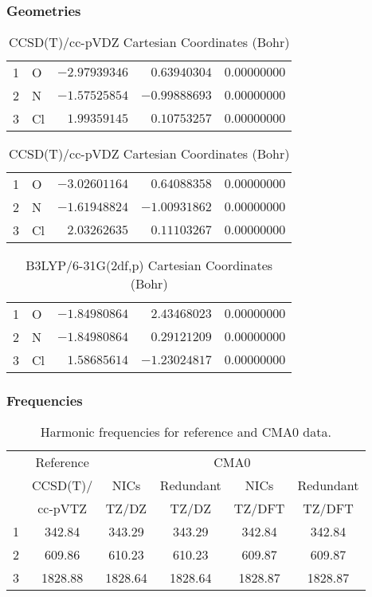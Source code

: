 \documentclass[10pt,oneside]{article}
\begin{document}
\begin{table}[h!]
\subsubsection*{Geometries}
\begin{multicols}{2}
\centering
\caption{CCSD(T)/cc-pVTZ Cartesian Coordinates (Bohr)}
\begin{tabular}{llrrr}
\toprule
1  & O  & $-2.97939346$ & $ 0.63940304$ & $ 0.00000000$ \\
2  & N  & $-1.57525854$ & $-0.99888693$ & $ 0.00000000$ \\
3  & Cl & $ 1.99359145$ & $ 0.10753257$ & $ 0.00000000$ \\
\bottomrule
\end{tabular}
\caption{CCSD(T)/cc-pVDZ Cartesian Coordinates (Bohr)}
\begin{tabular}{llrrr}
\toprule
1  & O  & $-3.02601164$ & $ 0.64088358$ & $ 0.00000000$ \\
2  & N  & $-1.61948824$ & $-1.00931862$ & $ 0.00000000$ \\
3  & Cl & $ 2.03262635$ & $ 0.11103267$ & $ 0.00000000$ \\
\bottomrule
\end{tabular}
\end{multicols}
\end{table}

\begin{table}[h]
\centering
\caption{B3LYP/6-31G(2df,p) Cartesian Coordinates (Bohr)}
\begin{tabular}{llrrr}
\toprule
1  & O  & $-1.84980864$ & $ 2.43468023$ & $ 0.00000000$ \\
2  & N  & $-1.84980864$ & $ 0.29121209$ & $ 0.00000000$ \\
3  & Cl & $ 1.58685614$ & $-1.23024817$ & $ 0.00000000$ \\
\bottomrule
\end{tabular}
\end{table}

\begin{table}[h!]
\subsubsection*{Frequencies}
\centering
\caption{Harmonic frequencies for reference and CMA0 data.}
\begin{tabular}{cccccc}
\toprule
{} & Reference & \multicolumn{4}{c}{CMA0} \\
{} &  CCSD(T)/ &    NICs &  Redundant &    NICs & Redundant \\
{} &   cc-pVTZ &   TZ/DZ &      TZ/DZ &  TZ/DFT &    TZ/DFT \\
\midrule
1 &    342.84 &  343.29 &     343.29 &  342.84 &    342.84 \\
2 &    609.86 &  610.23 &     610.23 &  609.87 &    609.87 \\
3 &   1828.88 & 1828.64 &    1828.64 & 1828.87 &   1828.87 \\
\bottomrule
\end{tabular}
\end{table}
\end{document}
